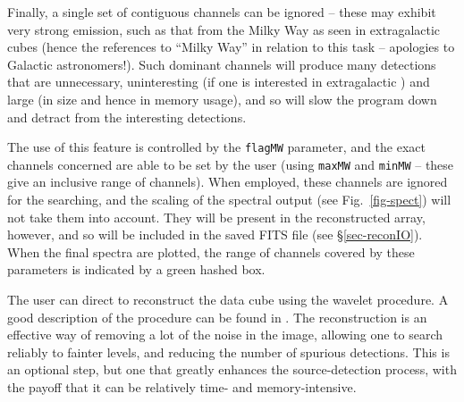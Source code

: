 \label{sec-MW}

Finally, a single set of contiguous channels can be ignored -- these
may exhibit very strong emission, such as that from the Milky Way as
seen in extragalactic \hi cubes (hence the references to ``Milky
Way'' in relation to this task -- apologies to Galactic
astronomers!). Such dominant channels will produce many detections
that are unnecessary, uninteresting (if one is interested in
extragalactic \hi) and large (in size and hence in memory usage), and
so will slow the program down and detract from the interesting
detections. 

The use of this feature is controlled by the \texttt{flagMW}
parameter, and the exact channels concerned are able to be set by the
user (using \texttt{maxMW} and \texttt{minMW} -- these give an
inclusive range of channels). When employed, these channels are
ignored for the searching, and the scaling of the spectral output (see
Fig.~\ref{fig-spect}) will not take them into account. They will be
present in the reconstructed array, however, and so will be included
in the saved FITS file (see \S\ref{sec-reconIO}). When the final
spectra are plotted, the range of channels covered by these parameters
is indicated by a green hashed box.

\label{sec-recon}

The user can direct \duchamp to reconstruct the data cube using the
\atrous wavelet procedure. A good description of the procedure can be
found in \citet{starck02:book}. The reconstruction is an effective way
of removing a lot of the noise in the image, allowing one to search
reliably to fainter levels, and reducing the number of spurious
detections. This is an optional step, but one that greatly enhances
the source-detection process, with the payoff that it can be
relatively time- and memory-intensive.


